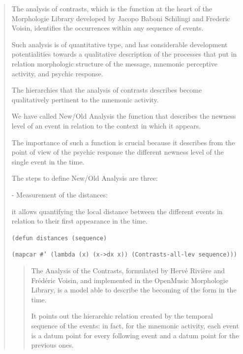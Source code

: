 \bigskip

\begin{quotation} 
\begin{slshape} 
\noindent The analysis of contrasts, which is the function at the heart of the Morphologie Library developed by Jacopo Baboni Schilingi and Frederic Voisin, identifies the occurrences within any sequence of events.

\noindent Such analysis is of quantitative type, and has considerable development potentialities towards a qualitative description of the processes that put in relation morphologic structure of the message, mnemonic perceptive activity, and psychic response.

\noindent The hierarchies that the analysis of contrasts describes become qualitatively pertinent to the mnemonic activity.

\noindent We have called New/Old Analysis the function that describes the newness level of an event in relation to the context in which it appears.

\noindent The importance of such a function is crucial because it describes from the point of view of the psychic response the different newness level of the single event in the time.

\noindent The steps to define New/Old Analysis are three:

 - Measurement of the distances:

\pagebreak

\noindent it allows quantifying the local distance between the different events in relation to their first appearance in the time.
\end{slshape}

\noindent\texttt{\footnotesize (defun distances (sequence)}

\noindent\texttt{\footnotesize \quad  (mapcar \#' (lambda (x) (x->dx x)) (Contrasts-all-lev sequence)))}

\begin{quotation} 
\begin{slshape} 
\noindent The Analysis of the Contrasts, formulated by Herv\'e Rivi\`ere and Fr\'ed\'eric Voisin, and implemented in the OpenMusic Morphologie Library, is a model able to describe the becoming of the form in the time.

\noindent It points out the hierarchic relation created by the temporal sequence of the events: in fact, for the mnemonic activity, each event is a datum point for every following event and a datum point for the previous ones.


\end{slshape}
\end{quotation}
\end{quotation}
